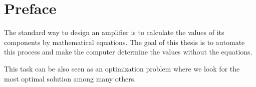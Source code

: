 \chapter{Preface}
The standard way to design an amplifier is to calculate the values of its components by mathematical equations. The goal of this thesis is to automate this process and make the computer determine the values without the equations.

This task can be also seen as an optimization problem where we look for the most optimal solution among many others.